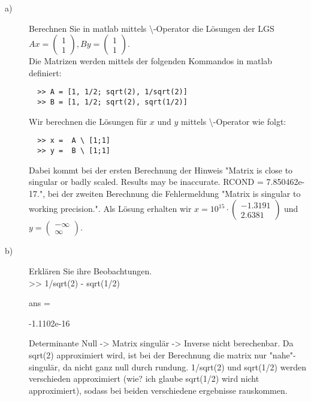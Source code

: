 \documentclass[11pt,a4paper,ngerman]{article}
\begin{document}
\begin{description}

\item[a)] Berechnen Sie in matlab mittels \textbackslash -Operator die Lösungen der LGS \\
          $Ax = \left( \begin{array}{c} 1 \\ 1\end{array}\right), 
           By = \left( \begin{array}{c} 1 \\ 1\end{array}\right)$. \\
            
          Die Matrizen werden mittels der folgenden Kommandos in matlab definiert:          
          \begin{lstlisting}
  >> A = [1, 1/2; sqrt(2), 1/sqrt(2)]
  >> B = [1, 1/2; sqrt(2), sqrt(1/2)]
          \end{lstlisting}
          
          Wir berechnen die Lösungen für $x$ und $y$ mittels \textbackslash -Operator wie folgt:

          \begin{lstlisting}
  >> x =  A \ [1;1]
  >> y =  B \ [1;1]
          \end{lstlisting}

          Dabei kommt bei der ersten Berechnung der Hinweis "Matrix is close to singular or badly scaled. Results may be inaccurate. RCOND = 7.850462e-17.", bei der zweiten Berechnung die Fehlermeldung "Matrix is singular to working precision.".
          Als Lösung erhalten wir
          $x = 10^{15} \cdot \left( \begin{array}{c} -1.3191 \\ 2.6381 \end{array} \right)$ und
          $y = \left( \begin{array}{c} -\infty \\ \infty \end{array} \right)$.

\item[b)] Erklären Sie ihre Beobachtungen. \\
          
          >> 1/sqrt(2) - sqrt(1/2)

ans =

  -1.1102e-16
              
          Determinante Null -> Matrix singulär -> Inverse nicht berechenbar.
          Da sqrt(2) approximiert wird, ist bei der Berechnung die matrix nur "nahe"-singulär, da nicht ganz null durch rundung.
         1/sqrt(2) und sqrt(1/2) werden verschieden approximiert (wie? ich glaube sqrt(1/2) wird nicht approximiert), sodass bei beiden verschiedene ergebnisse rauskommen.

\end{description}
\end{document}
